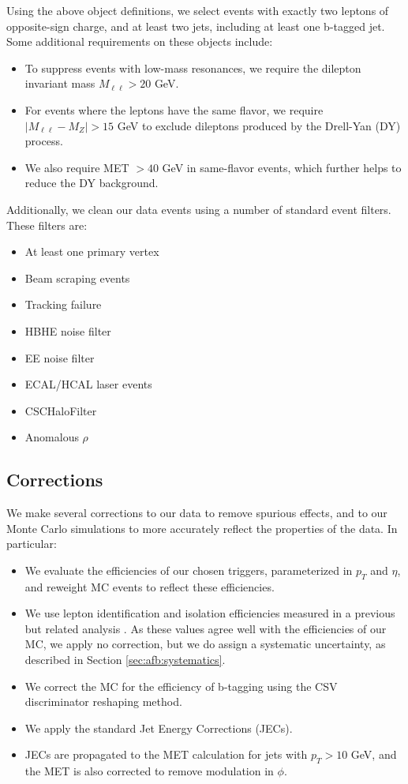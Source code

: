 Using the above object definitions, we select events with exactly
two leptons of opposite-sign charge, and at least two jets, including at
least one b-tagged jet. Some additional requirements on these objects
include:

\begin{itemize}
\item To suppress events with low-mass resonances, we require the
  dilepton invariant mass $M_{\ell\ell} > 20$ GeV.
\item For events where the leptons have the same flavor, we require
  $|M_{\ell\ell} - M_Z| > 15$ GeV to exclude dileptons produced by the
  Drell-Yan (DY) process.
\item We also require MET $> 40$ GeV in same-flavor events, which
  further helps to reduce the DY background.
\end{itemize}

Additionally, we clean our data events using a number of standard
event filters. These filters are:

\begin{itemize}
\item At least one primary vertex
\item Beam scraping events
\item Tracking failure
\item HBHE noise filter
\item EE noise filter
\item ECAL/HCAL laser events
\item CSCHaloFilter
\item Anomalous $\rho$
\end{itemize}

\subsection{Corrections}
\label{ssec:afb:evtweights}

We make several corrections to our data to remove spurious effects,
and to our Monte Carlo simulations to more accurately reflect the
properties of the data. In particular:

\begin{itemize}
\item We evaluate the efficiencies of our chosen triggers,
  parameterized in $p_T$ and $\eta$, and reweight
  MC events to reflect these efficiencies. %
\item We use lepton identification and isolation efficiencies measured
  in a previous but related analysis \cite{run1stop1l}. As these values agree well with
  the efficiencies of our MC, we apply no correction, but we do assign
  a systematic uncertainty, as described in Section
  \ref{sec:afb:systematics}.
\item We correct the MC for the efficiency of b-tagging using the CSV
  discriminator reshaping method.
\item We apply the standard Jet Energy Corrections (JECs).
\item JECs are propagated to the MET calculation for jets with $p_T >
  10$ GeV, and the MET is also corrected to remove modulation in $\phi$.
\end{itemize}

